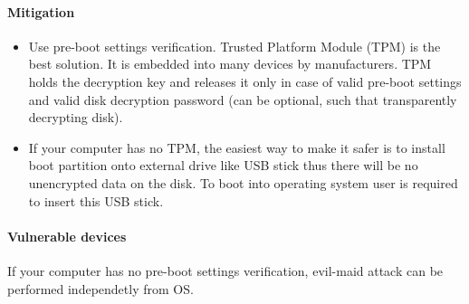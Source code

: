 \paragraph*{Mitigation}
\begin{itemize}
    \item Use pre-boot settings verification. Trusted Platform Module (TPM) is the best solution. It is embedded into many devices by manufacturers. TPM holds the decryption key and releases it only in case of valid pre-boot settings and valid disk decryption password (can be optional, such that transparently decrypting disk).

    \item If your computer has no TPM, the easiest way to make it safer is to install boot partition onto external drive like USB stick thus there will be no unencrypted data on the disk. To boot into operating system user is required to insert this USB stick.
\end{itemize}

\paragraph*{Vulnerable devices}
If your computer has no pre-boot settings verification, evil-maid attack can be performed independetly from OS.
